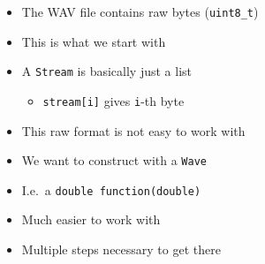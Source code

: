 \begin{frame}
\begin{center}
  \end{center}
  \begin{overprint}
    \begin{itemize}
      \item The WAV file contains raw bytes (\texttt{uint8\_t})
      \item This is what we start with
      \item A \texttt{Stream} is basically just a list
            \begin{itemize}
              \item \texttt{stream[i]} gives \texttt{i}-th byte
            \end{itemize}
      \item This raw format is not easy to work with
    \end{itemize}
    \begin{itemize}
      \item We want to construct with a \texttt{Wave}
      \item I.e.~a \texttt{double function(double)}
      \item Much easier to work with
      \item Multiple steps necessary to get there
    \end{itemize}
  \end{overprint}
\end{frame}










